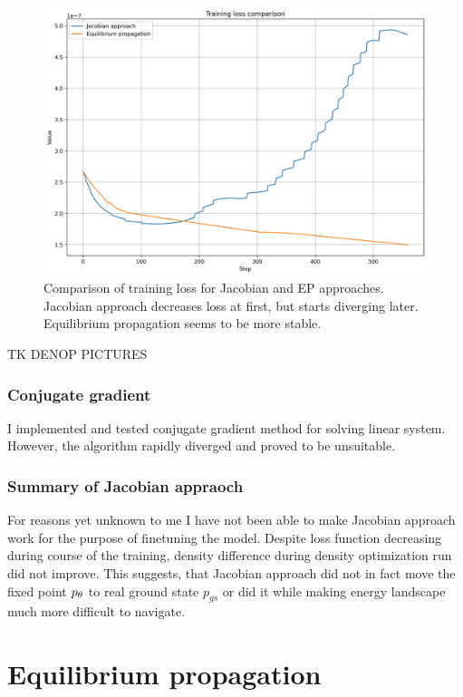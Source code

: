 \documentclass[a4paper,10pt]{report}
\begin{document}
\begin{figure}[h!]
 \centering
 \includegraphics[scale=0.5]{images/loss_comparison.png}
 \caption{Comparison of training loss for Jacobian and EP approaches. Jacobian approach decreases loss at first, but starts diverging later. Equilibrium propagation seems to be more stable.}
 \label{fig:jac-eqprop-loss}
\end{figure}



TK DENOP PICTURES

\subsubsection{Conjugate gradient}
I implemented and tested conjugate gradient method for solving linear system. However, the algorithm rapidly diverged and proved to be unsuitable.
\subsubsection{Summary of Jacobian appraoch}

 For reasons yet unknown to me I have not been able to make Jacobian approach work for the purpose of finetuning the model. Despite loss function decreasing during course of the training, density difference during density optimization run did not improve. This suggests, that Jacobian approach did not in fact move the fixed point $p_\theta$ to real ground state $p_{gs}$ or did it while making energy landscape much more difficult to navigate.


\section{ Equilibrium propagation}
\end{document}
